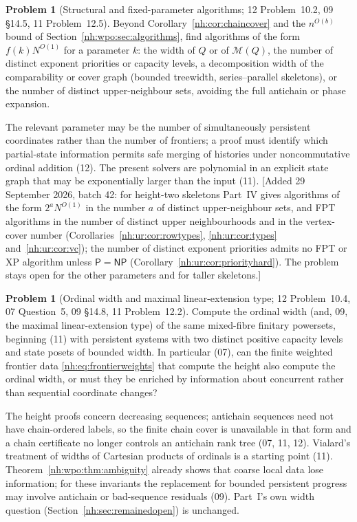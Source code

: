 \documentclass[11pt,a4paper]{article}
\theoremstyle{definition}
\newtheorem{problem}[theorem]{Problem}
\theoremstyle{remark}
\newcommand{\M}{\mathcal M}
\begin{document}
\begin{problem}[Structural and fixed-parameter algorithms; 12 Problem~10.2, 09 \S14.5, 11 Problem~12.5]
\label{nh:prob:fpt}
Beyond Corollary~\ref{nh:cor:chaincover} and the $n^{O(b)}$ bound of
Section~\ref{nh:wpo:sec:algorithms}, find algorithms of the form $f(k)N^{O(1)}$ for
a parameter $k$: the width of $Q$ or of $\M(Q)$, the number of distinct exponent
priorities or capacity levels, a decomposition width of the comparability or cover
graph (bounded treewidth, series--parallel skeletons), or the number of distinct
upper-neighbour sets, avoiding the full antichain or phase expansion.
\end{problem}
The relevant parameter may be the number of simultaneously persistent coordinates
rather than the number of frontiers; a proof must identify which partial-state
information permits safe merging of histories under noncommutative ordinal addition
(12). The present solvers are polynomial in an explicit state graph that may be
exponentially larger than the input (11).
[Added 29 September 2026, batch 42: for height-two skeletons Part~IV gives
algorithms of the form $2^aN^{O(1)}$ in the number $a$ of distinct
upper-neighbour sets, and FPT algorithms in the number of distinct upper
neighbourhoods and in the vertex-cover number
(Corollaries~\ref{nh:ur:cor:rowtypes}, \ref{nh:ur:cor:types}
and~\ref{nh:ur:cor:vc}); the number of distinct exponent priorities admits no
FPT or XP algorithm unless $\mathsf P=\mathsf{NP}$
(Corollary~\ref{nh:ur:cor:priorityhard}). The problem stays open for the other
parameters and for taller skeletons.]

\begin{problem}[Ordinal width and maximal linear-extension type; 12 Problem~10.4, 07 Question~5, 09 \S14.8, 11 Problem~12.2]
\label{nh:prob:width}
Compute the ordinal width (and, 09, the maximal linear-extension type) of the same
mixed-fibre finitary powersets, beginning (11) with persistent systems with two
distinct positive capacity levels and state posets of bounded width. In
particular (07), can the finite weighted frontier data
\eqref{nh:eq:frontierweights} that compute the height also compute the ordinal
width, or must they be enriched by information about concurrent rather than
sequential coordinate changes?
\end{problem}
The height proofs concern decreasing sequences; antichain sequences need not have
chain-ordered labels, so the finite chain cover is unavailable in that form and a
chain certificate no longer controls an antichain rank tree (07, 11, 12).
Vialard's treatment of widths of Cartesian products of ordinals
\cite{VialardWidth2025} is a starting point (11). Theorem~\ref{nh:wpo:thm:ambiguity}
already shows that coarse local data lose information; for these invariants the
replacement for bounded persistent progress may involve antichain or bad-sequence
residuals (09). Part~I's own width question (Section~\ref{nh:sec:remainedopen})
is unchanged.
\end{document}
